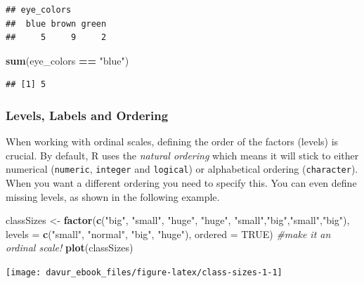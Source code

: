 \documentclass[]{book}
\newenvironment{Shaded}{\begin{snugshade}}{\end{snugshade}}
\newcommand{\CommentTok}[1]{\textcolor[rgb]{0.56,0.35,0.01}{\textit{#1}}}
\newcommand{\DataTypeTok}[1]{\textcolor[rgb]{0.13,0.29,0.53}{#1}}
\newcommand{\KeywordTok}[1]{\textcolor[rgb]{0.13,0.29,0.53}{\textbf{#1}}}
\newcommand{\NormalTok}[1]{#1}
\newcommand{\OperatorTok}[1]{\textcolor[rgb]{0.81,0.36,0.00}{\textbf{#1}}}
\newcommand{\OtherTok}[1]{\textcolor[rgb]{0.56,0.35,0.01}{#1}}
\newcommand{\StringTok}[1]{\textcolor[rgb]{0.31,0.60,0.02}{#1}}
\begin{document}
\begin{verbatim}
## eye_colors
##  blue brown green 
##     5     9     2
\end{verbatim}

\begin{Shaded}
\begin{Highlighting}[]
\KeywordTok{sum}\NormalTok{(eye_colors }\OperatorTok{==}\StringTok{ "blue"}\NormalTok{)}
\end{Highlighting}
\end{Shaded}

\begin{verbatim}
## [1] 5
\end{verbatim}

\hypertarget{levels-labels-and-ordering}{%
\subsubsection*{Levels, Labels and Ordering}\label{levels-labels-and-ordering}}

When working with ordinal scales, defining the order of the factors (levels) is crucial. By default, R uses the \emph{natural ordering} which means it will stick to either numerical (\texttt{numeric}, \texttt{integer} and \texttt{logical}) or alphabetical ordering (\texttt{character}). When you want a different ordering you need to specify this. You can even define missing levels, as shown in the following example.

\begin{Shaded}
\begin{Highlighting}[]
\NormalTok{classSizes <-}\StringTok{ }\KeywordTok{factor}\NormalTok{(}\KeywordTok{c}\NormalTok{(}\StringTok{"big"}\NormalTok{, }\StringTok{"small"}\NormalTok{, }\StringTok{"huge"}\NormalTok{, }\StringTok{"huge"}\NormalTok{, }
    \StringTok{"small"}\NormalTok{,}\StringTok{"big"}\NormalTok{,}\StringTok{"small"}\NormalTok{,}\StringTok{"big"}\NormalTok{),}
    \DataTypeTok{levels =} \KeywordTok{c}\NormalTok{(}\StringTok{"small"}\NormalTok{, }\StringTok{"normal"}\NormalTok{, }\StringTok{"big"}\NormalTok{, }\StringTok{"huge"}\NormalTok{),}
    \DataTypeTok{ordered =} \OtherTok{TRUE}\NormalTok{) }\CommentTok{#make it an ordinal scale!}
\KeywordTok{plot}\NormalTok{(classSizes)}
\end{Highlighting}
\end{Shaded}

\begin{center}\texttt{[image: davur\_ebook\_files/figure-latex/class-sizes-1-1]} \end{center}
\end{document}
